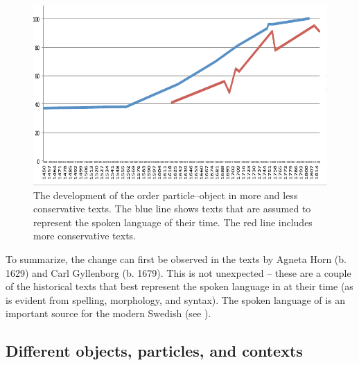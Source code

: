 \documentclass[output=paper]{langscibook}
\begin{document}
  
\begin{figure}
\includegraphics[width=\textwidth]{figures/a4-img002.pdf}
\caption{The development of the order particle–object in more and less conservative texts. The blue line shows texts that are assumed to represent the spoken language of their time. The red line includes more conservative texts.\label{fig:lalu:2}} 
\end{figure}


To summarize, the change can first be observed in the texts by Agneta Horn (b. 1629) and Carl Gyllenborg (b. 1679). This is not unexpected – these are a couple of the historical texts that best represent the spoken language in  at their time (as is evident from spelling, morphology, and syntax). The spoken language of  is an important source for the modern Swedish  (see ). 


\subsection{Different objects, particles, and contexts}\label{sec:lalu:5.2}
\end{document}
